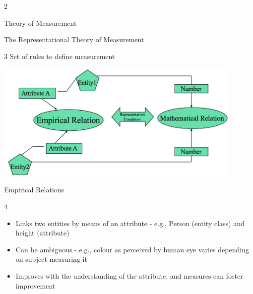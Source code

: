 \documentclass{beamer}
\begin{document}
\begin{frame}{\centerline{}}
2

\begin{center}
{\Large
Theory of Measurement
}
\end{center}

\end{frame}



\begin{frame}{\centerline{The Representational Theory of Measurement}}
3
Set of rules to define measurement

\begin{center}
\includegraphics[width=120mm]{A2022.IDSEPC.SperimentazioneDeduzione/img-img07.png}
\end{center}
\end{frame}

\begin{frame}{\centerline{Empirical Relations}}
4

\begin{itemize}
\item  Links two entities by means of an attribute - e.g., Person (entity class) and height (attribute)
\item  Can be ambiguous - e.g., colour as perceived by human eye varies depending on subject measuring it
\item  Improves with the understanding of the attribute, and measures can foster improvement

\end{itemize}

\end{frame}
\end{document}
